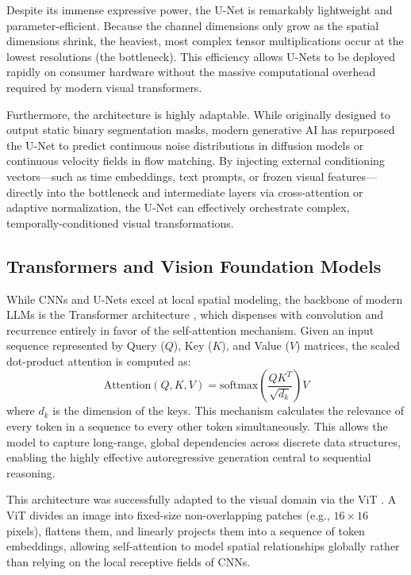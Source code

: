 \documentclass{l4proj}
\begin{document}
Despite its immense expressive power, the U-Net is remarkably lightweight and parameter-efficient. Because the channel dimensions only grow as the spatial dimensions shrink, the heaviest, most complex tensor multiplications occur at the lowest resolutions (the bottleneck). This efficiency allows U-Nets to be deployed rapidly on consumer hardware without the massive computational overhead required by modern visual transformers.

Furthermore, the architecture is highly adaptable. While originally designed to output static binary segmentation masks, modern generative AI has repurposed the U-Net to predict continuous noise distributions in diffusion models or continuous velocity fields in flow matching. By injecting external conditioning vectors—such as time embeddings, text prompts, or frozen visual features—directly into the bottleneck and intermediate layers via cross-attention or adaptive normalization, the U-Net can effectively orchestrate complex, temporally-conditioned visual transformations.

\subsection{Transformers and Vision Foundation Models}
While CNNs and U-Nets excel at local spatial modeling, the backbone of modern LLMs is the Transformer architecture \citep{vaswani2017attention}, which dispenses with convolution and recurrence entirely in favor of the self-attention mechanism. Given an input sequence represented by Query ($Q$), Key ($K$), and Value ($V$) matrices, the scaled dot-product attention is computed as:
\begin{equation}
    \text{Attention}(Q, K, V) = \text{softmax}\left(\frac{QK^T}{\sqrt{d_k}}\right)V
\end{equation}
where $d_k$ is the dimension of the keys. This mechanism calculates the relevance of every token in a sequence to every other token simultaneously. This allows the model to capture long-range, global dependencies across discrete data structures, enabling the highly effective autoregressive generation central to sequential reasoning.

This architecture was successfully adapted to the visual domain via the ViT \citep{dosovitskiy2020image}. A ViT divides an image into fixed-size non-overlapping patches (e.g., $16 \times 16$ pixels), flattens them, and linearly projects them into a sequence of token embeddings, allowing self-attention to model spatial relationships globally rather than relying on the local receptive fields of CNNs.
\end{document}
